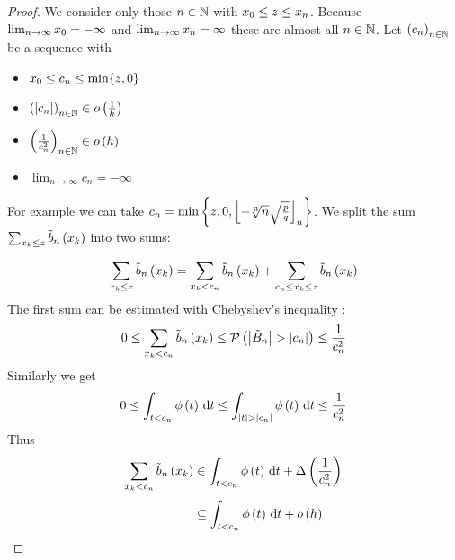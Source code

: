 \begin{proof}
  We consider only those $n\in\N$ with $\x[0] \le z \le \x[n]$. Because $\lim_{n\to\infty} \x[0] = -\infty$ and $\lim_{n\to\infty} \x[n] = \infty$ these are almost all $n\in\N$. Let $\seq{c_n}$ be a sequence with
  \begin{itemize}
    \item $\x[0] \le c_n \le \min\{z,0\}$
    \item $\seq{\abs{c_n}}\in\littleo{\frac 1h}$
    \item $\seq{\frac{1}{c_n^2}} \in \littleo{h}$
    \item $\lim_{n\to\infty} c_n=-\infty$
  \end{itemize}
  For example we can take $c_n = \min\left\{z, 0, \xdown{- \sqrt[3]{n}\sqrt{\frac pq}}\right\}$. We split the sum $\sum_{\x \le z} \bb{\x}$ into two sums:

  \begin{align}
    \sum_{\x \le z} \bb{\x} = \sum_{\x < c_n} \bb{\x} + \sum_{c_n \le \x \le z} \bb{\x}
  \end{align}
  The first sum can be estimated with Chebyshev's inequality \cite{wiki:chebyshev}:
  \begin{align}
    0 \le \sum_{\x < c_n} \bb{\x} \le \P{\abs{\BBs} > \abs{c_n}} \le \frac{1}{c_n^2}
  \end{align}
  Similarly we get
  \begin{align}
    0 \le \int_{t < c_n} \fphi{t}\d{t} \le \int_{\abs{t} > \abs{c_n}} \fphi{t} \d{t} \le \frac{1}{c_n^2}
  \end{align}
  Thus
  \begin{align}
    \sum_{\x < c_n} \bb{\x} & \in \int_{t < c_n} \fphi{t}\d{t} + \bigabs{\frac{1}{c_n^2}} \nl
    & \subseteq \int_{t < c_n} \fphi{t}\d{t} + \littleo{h}
  \end{align}


\end{proof}
